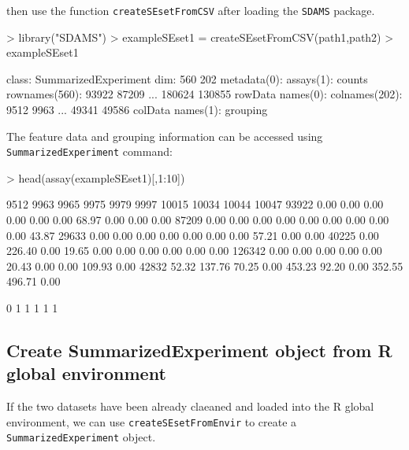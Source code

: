 \documentclass[12pt]{article}
\begin{document}
then use the function {\tt createSEsetFromCSV} after loading the {\tt SDAMS}
package.
\begin{Schunk}
\begin{Sinput}
> library("SDAMS")
> exampleSEset1 = createSEsetFromCSV(path1,path2)
> exampleSEset1
\end{Sinput}
\begin{Soutput}
class: SummarizedExperiment 
dim: 560 202 
metadata(0):
assays(1): counts
rownames(560): 93922 87209 ... 180624 130855
rowData names(0):
colnames(202): 9512 9963 ... 49341 49586
colData names(1): grouping
\end{Soutput}
\end{Schunk}

The feature data and grouping information can be accessed using
{\tt SummarizedExperiment} command:
\begin{Schunk}
\begin{Sinput}
> head(assay(exampleSEset1)[,1:10])
\end{Sinput}
\begin{Soutput}
        9512   9963  9965  9975   9979  9997 10015  10034  10044 10047
93922   0.00   0.00  0.00  0.00   0.00  0.00 68.97   0.00   0.00  0.00
87209   0.00   0.00  0.00  0.00   0.00  0.00  0.00   0.00   0.00 43.87
29633   0.00   0.00  0.00  0.00   0.00  0.00  0.00  57.21   0.00  0.00
40225   0.00 226.40  0.00 19.65   0.00  0.00  0.00   0.00   0.00  0.00
126342  0.00   0.00  0.00  0.00   0.00 20.43  0.00   0.00 109.93  0.00
42832  52.32 137.76 70.25  0.00 453.23 92.20  0.00 352.55 496.71  0.00
\end{Soutput}
\begin{Soutput}
[1] 0 1 1 1 1 1
\end{Soutput}
\end{Schunk}


\subsection{Create SummarizedExperiment object from R global environment}
If the two datasets have been already claeaned and loaded into the R global
environment, we can use {\tt createSEsetFromEnvir} to create a
{\tt SummarizedExperiment} object.
\end{document}
